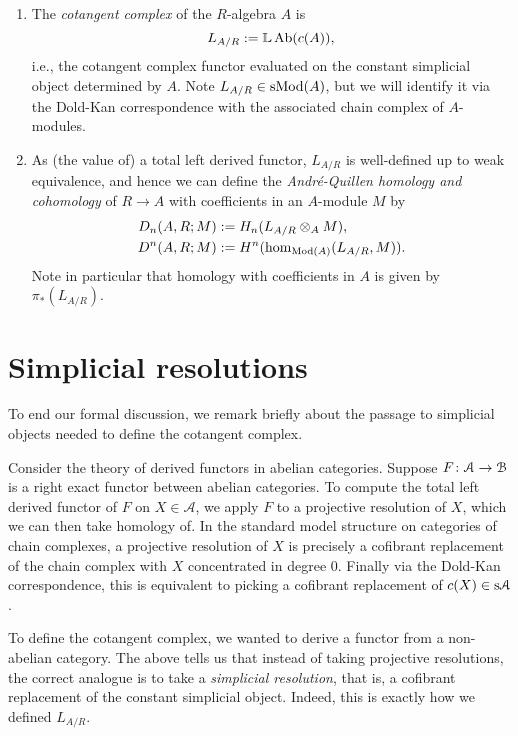 \begin{definitions}
  \begin{enumerate}[leftmargin=*]
  \item The \emph{cotangent complex} of the $R$-algebra
    $A$ is
    \[
    L_{A/R} \mathrel{:=} \mathbb{L}\operatorname{Ab}(c(A)),
    \]
    i.e., the cotangent complex functor evaluated on the constant
    simplicial object determined by $A$. Note $L_{A/R} \in
    \mathrm{s}\mathrm{Mod}(A)$, but we will identify it via the Dold-Kan
    correspondence with the associated chain complex of $A$-modules.
  \item As (the value of) a total left derived functor, $L_{A/R}$
    is well-defined up to weak equivalence, and hence we can define
    the \emph{Andr\'e-Quillen homology and cohomology} of $R \to A$
    with coefficients in an $A$-module $M$ by
    \begin{align*}
      D_n(A,R;M) &\mathrel{:=} H_n(L_{A/R} \otimes_A M),\\ D^n(A,R;M)
      &\mathrel{:=} H^n(\operatorname{hom}_{\mathrm{Mod}(A)}(L_{A/R}, M)).
    \end{align*}
    Note in particular that homology with coefficients in $A$ is given
    by $\pi_*(L_{A/R})$.
  \end{enumerate}
\end{definitions}


\section{Simplicial resolutions}

To end our formal discussion, we remark briefly about the passage to
simplicial objects needed to define the cotangent complex.

\renewcommand{\A}{\mathcal{A}}
\renewcommand{\B}{\mathcal{B}}

Consider the theory of derived functors in abelian categories. Suppose
$F \c \A \to \B$ is a right exact functor between abelian
categories. To compute the total left derived functor of $F$ on $X \in
\A$, we apply $F$ to a projective resolution of $X$, which we can then
take homology of. In the standard model structure on categories of
chain complexes, a projective resolution of $X$ is precisely a
cofibrant replacement of the chain complex with $X$ concentrated in
degree $0$. Finally via the Dold-Kan correspondence, this is
equivalent to picking a cofibrant replacement of $c(X) \in \s\A$.

To define the cotangent complex, we wanted to derive a functor from a
non-abelian category. The above tells us that instead of taking
projective resolutions, the correct analogue is to take a
\emph{simplicial resolution}, that is, a cofibrant replacement of the
constant simplicial object. Indeed, this is exactly how we defined
$L_{A/R}$.

